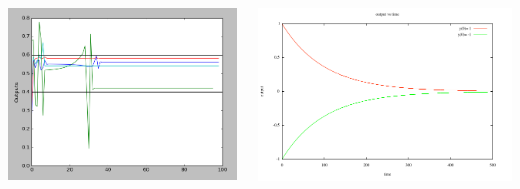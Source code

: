 \documentclass[aspectratio=169]{beamer}
\begin{document}
\begin{frame}[fragile]{}
  \begin{columns}
    \begin{column}{0.47\textwidth}
      \includegraphics[width=1.0\textwidth,height=.5\textheight]{Imagenes/CustomHomeostat}
    \end{column}
    \begin{column}{0.5\textwidth}
      \includegraphics[width=1.0\textwidth,height=.5\textheight]{Imagenes/Decaimiento}
    \end{column}
  \end{columns}
\end{frame}
\end{document}
